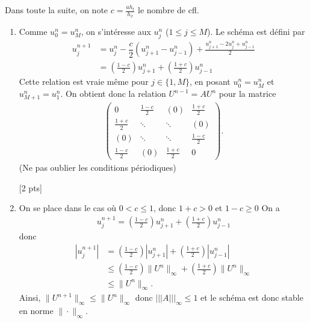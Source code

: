 \documentclass[12pt]{article}
\begin{document}
\begin{cor}
  $\quad$
  \\
  Dans toute la suite, on note
  $c = \frac{a h_t}{h_x}$ le nombre de cfl.
  \begin{enumerate}
  \item
    Comme $u_0^n = u_M^n$, on s'int\'eresse aux $u_j^n$ ($1 \leq j \leq M$).
    Le sch\'ema est d\'efini par
    \begin{align*}
      u_{j}^{n+1}
      &= u_j^n - \dfrac{c}{2} ( u_{j+1}^n - u_{j-1}^n ) + \frac{u_{j+1}^n - 2 u_j^n + u_{j-1}^n}{2}
      \\
      &= \left( \frac{1-c}2 \right) u_{j+1}^n + \left( \frac{1+c}2 \right) u_{j-1}^n
    \end{align*}
    Cette relation est vraie m\^eme pour $j \in \{1,M\}$, en posant
    $u_0^n = u_M^n$ et $u_{M+1}^n = u_1^n$.
    On obtient donc la relation $U^{n-1} = A U^n$ pour la matrice
    \begin{align*}
      \begin{pmatrix}
        0 & \frac{1-c}2 & (0) & \frac{1+c}2
        \\
        \frac{1+c}2 & \ddots & \ddots &  (0)
        \\
        (0)& \ddots & \ddots & \frac{1-c}2
        \\
        \frac{1-c}2 & (0) & \frac{1+c}2 & 0
      \end{pmatrix} .
    \end{align*}
    (Ne pas oublier les conditions p\'eriodiques)

    [2 pts]

  \item
    On se place dans le cas o\`u $0 < c \leq 1$, donc $1+c > 0$ et $1-c \geq 0$
    On a
    \begin{align*}
      u_{j}^{n+1} = \left( \frac{1-c}2 \right) u_{j+1}^n + \left( \frac{1+c}2 \right) u_{j-1}^n
    \end{align*}
    donc
    \begin{align*}
      | u_{j}^{n+1} |
      &= \left( \frac{1-c}2 \right) | u_{j+1}^n | + \left( \frac{1+c}2 \right) |u_{j-1}^n|
      \\
      &\leq \left( \frac{1-c}2 \right) \| U^n \|_{\infty}
        + \left( \frac{1+c}2 \right) \| U^n \|_{\infty}
      \\
      &\leq \| U^n \|_{\infty} .
    \end{align*}
    Ainsi, $\| U^{n+1} \|_{\infty} \leq \| U^n \|_{\infty}$ donc $||| A |||_{\infty} \leq 1$
    et le sch\'ema est donc stable en norme $\| \cdot \|_{\infty}$.
    

\end{enumerate}
\end{cor}
\end{document}
